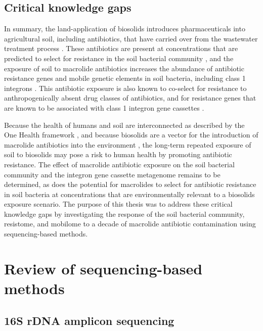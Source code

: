 \subsection{Critical knowledge gaps}

In summary, the land-application of biosolids introduces pharmaceuticals into agricultural soil, including antibiotics, that have carried over from the wastewater treatment process \parencite{McClellan.2010, Sabourin.2012}.
These antibiotics are present at concentrations that are predicted to select for resistance in the soil bacterial community \parencite{U.S.EnvironmentalProtectionAgency.2021, BengtssonPalme.2016}, and the exposure of soil to macrolide antibiotics increases the abundance of antibiotic resistance genes and mobile genetic elements in soil bacteria, including class 1 integrons \parencite{Lau.2020}.
This antibiotic exposure is also known to co-select for resistance to anthropogenically absent drug classes of antibiotics, and for resistance genes that are known to be associated with class 1 integron gene cassettes \parencite{Lau.2020}.

Because the health of humans and soil are interconnected as described by the One Health framework \parencite{Tiedje.2019}, and because biosolids are a vector for the introduction of macrolide antibiotics into the environment \parencite{Sabourin.2012, McClellan.2010}, the long-term repeated exposure of soil to biosolids may pose a risk to human health by promoting antibiotic resistance.
The effect of macrolide antibiotic exposure on the soil bacterial community and the integron gene cassette metagenome remains to be determined, as does the potential for macrolides to select for antibiotic resistance in soil bacteria at concentrations that are environmentally relevant to a biosolids exposure scenario.
The purpose of this thesis was to address these critical knowledge gaps by investigating the response of the soil bacterial community, resistome, and mobilome to a decade of macrolide antibiotic contamination using sequencing-based methods.

\section{Review of sequencing-based methods}

\subsection{16S rDNA amplicon sequencing}

